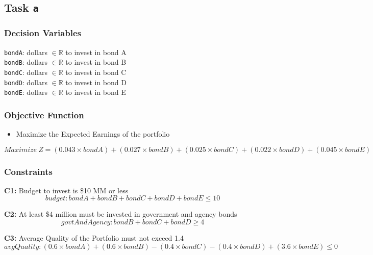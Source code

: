 \documentclass[
  12pt,
]{article}
\providecommand{\tightlist}{%
  \setlength{\itemsep}{0pt}\setlength{\parskip}{0pt}}
\begin{document}
\hypertarget{task-a}{%
\subsection{\texorpdfstring{Task \texttt{a}}{Task a}}\label{task-a}}

\hypertarget{decision-variables}{%
\subsubsection{Decision Variables}\label{decision-variables}}

\texttt{bondA}: dollars \(\in \mathbb{R}\) to invest in bond A\\
\texttt{bondB}: dollars \(\in \mathbb{R}\) to invest in bond B\\
\texttt{bondC}: dollars \(\in \mathbb{R}\) to invest in bond C\\
\texttt{bondD}: dollars \(\in \mathbb{R}\) to invest in bond D\\
\texttt{bondE}: dollars \(\in \mathbb{R}\) to invest in bond E

\hypertarget{objective-function}{%
\subsubsection{Objective Function}\label{objective-function}}

\begin{itemize}
\tightlist
\item
  Maximize the Expected Earnings of the portfolio
\end{itemize}

\[
Maximize \ Z = (0.043 \times bondA) + (0.027 \times bondB) + (0.025 \times bondC) + (0.022 \times bondD) + (0.045 \times bondE)
\]

\hypertarget{constraints}{%
\subsubsection{Constraints}\label{constraints}}

\textbf{C1:} Budget to invest is \$10 MM or less \[
budget: bondA + bondB + bondC + bondD + bondE \leq 10
\]

\textbf{C2:} At least \$4 million must be invested in government and
agency bonds \[
govtAndAgency: bondB + bondC + bondD \geq 4
\]

\textbf{C3:} Average Quality of the Portfolio must not exceed 1.4 \[
avgQuality: (0.6 \times bondA) + (0.6 \times bondB) - (0.4 \times bondC) 
- (0.4 \times bondD) + (3.6 \times bondE) \leq 0
\]
\end{document}
